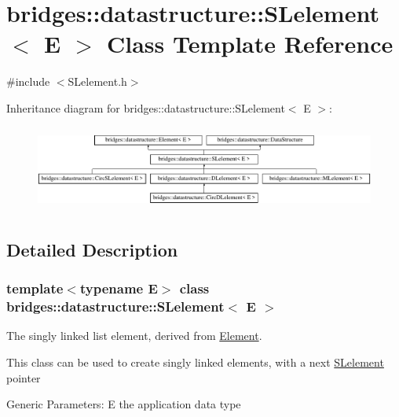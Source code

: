 \hypertarget{classbridges_1_1datastructure_1_1_s_lelement}{}\section{bridges\+:\+:datastructure\+:\+:S\+Lelement$<$ E $>$ Class Template Reference}
\label{classbridges_1_1datastructure_1_1_s_lelement}


{\ttfamily \#include $<$S\+Lelement.\+h$>$}

Inheritance diagram for bridges\+:\+:datastructure\+:\+:S\+Lelement$<$ E $>$\+:\begin{figure}[H]
\begin{center}
\leavevmode
\includegraphics[height=2.839037cm]{classbridges_1_1datastructure_1_1_s_lelement}
\end{center}
\end{figure}


\subsection{Detailed Description}
\subsubsection*{template$<$typename E$>$\newline
class bridges\+::datastructure\+::\+S\+Lelement$<$ E $>$}

The singly linked list element, derived from \hyperlink{classbridges_1_1datastructure_1_1_element}{Element}. 

This class can be used to create singly linked elements, with a next \hyperlink{classbridges_1_1datastructure_1_1_s_lelement}{S\+Lelement} pointer

Generic Parameters\+: E the application data type

